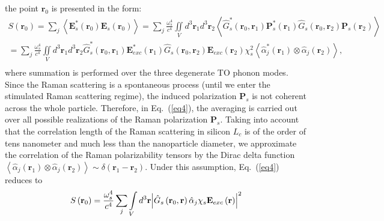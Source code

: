         the point $\mathbf{r}_0$ is presented in the form:
        \begin{align} %
                  S\left( {{{\mathbf{r}}_0}} \right) = \sum\limits_j {\left\langle {{\mathbf{E}}_s^*\left( {{{\mathbf{r}}_0}} \right){{\mathbf{E}}_s}\left( {{{\mathbf{r}}_0}} \right)} \right\rangle }  = \sum\limits_j {\frac{{\omega _s^4}}
                {{{c^4}}}\iint\limits_V {{d^3}{{\mathbf{r}}_1}{d^3}{{\mathbf{r}}_2}\left\langle {\hat G_s^*\left( {{{\mathbf{r}}_0},{{\mathbf{r}}_1}} \right){\mathbf{P}}_s^*\left( {{{\mathbf{r}}_1}} \right){{\hat G}_s}\left( {{{\mathbf{r}}_0},{{\mathbf{r}}_2}} \right){{\mathbf{P}}_s}\left( {{{\mathbf{r}}_2}} \right)} \right\rangle }}  \\
                   = \sum\limits_j {\frac{{\omega _s^4}}
                {{{c^4}}}\iint\limits_V {{d^3}{{\mathbf{r}}_1}{d^3}{{\mathbf{r}}_2}\hat G_s^*\left( {{{\mathbf{r}}_0},{{\mathbf{r}}_1}} \right){\mathbf{E}}_{exc}^*\left( {{{\mathbf{r}}_1}} \right){{\hat G}_s}\left( {{{\mathbf{r}}_0},{{\mathbf{r}}_2}} \right){{\mathbf{E}}_{exc}}\left( {{{\mathbf{r}}_2}} \right)\chi _s^2\left\langle {\hat \alpha _j^*\left( {{{\mathbf{r}}_1}} \right) \otimes {{\hat \alpha }_j}\left( {{{\mathbf{r}}_2}} \right)} \right\rangle }},  \\
            \label{eq4}
        \end{align}
        where summation is performed over the three degenerate TO phonon modes. Since the Raman scattering is a spontaneous process
        (until we enter the stimulated Raman scattering regime), the  induced polarization $\mathbf{P}_s$ is not coherent across
        the whole particle. Therefore, in Eq.~(\ref{eq4}), the averaging is carried out over all possible realizations of the Raman
        polarization $\mathbf{P}_s$. Taking into account that the correlation length of the Raman scattering in silicon $L_c$ is of
        the order of tens nanometer and much less than the nanoparticle diameter, we approximate the correlation of the Raman
        polarizability tensors by the Dirac delta function
        $\left\langle {\hat \alpha_j \left( {{{\mathbf{r}}_1}} \right) \otimes \hat \alpha_j \left( {{{\mathbf{r}}_2}} \right)} \right\rangle \sim \delta \left({{\mathbf{r}_1} - {\mathbf{r}_2}} \right)$.
        Under this assumption, Eq.~(\ref{eq4}) reduces to
        \begin{align}
            S\left( {{{\bf{r}}_0}} \right) = \frac{{\omega _s^4}}{{{c^4}}}\sum\limits_j {\int\limits_V {{d^3}{\bf{r}}{{\left| {{{\hat G}_s}\left(
            {{{\bf{r}}_0},{\bf{r}}} \right){{\hat \alpha }_j}{\chi _s}{{\bf{E}}_{exc}}\left( {\bf{r}} \right)} \right|}^2}} }
            \label{eq5}
        \end{align}
